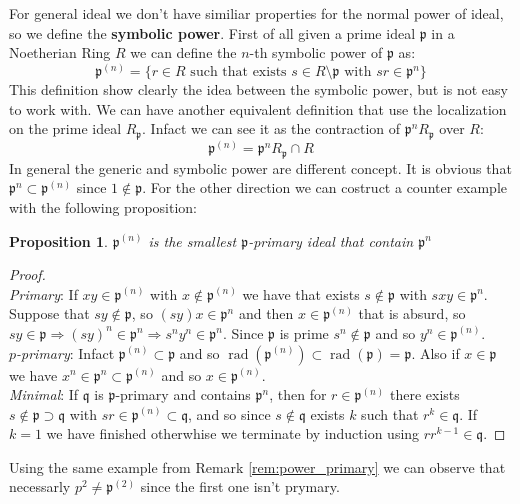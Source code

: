 \documentclass[]{book}
\theoremstyle{plain}
\newtheorem{prop}[teo]{Proposition}
\theoremstyle{remark}
\theoremstyle{definition}
\newcommand{\p}{\mathfrak{p}}
\newcommand{\q}{\mathfrak{q}}
\DeclareMathOperator{\rad}{rad}
\begin{document}
	For general ideal we don't have similiar properties for the normal power of ideal, so we define the \textbf{symbolic power}. %
	First of all given a prime ideal $ \p $ in a Noetherian Ring $ R $ we can define the $ n $-th symbolic power of $ \p $ as:
	\begin{equation}\label{eq:sym_pow_p1}
		\p^{(n)} = \{ r \in R \text{ such that exists } s \in R \setminus \p \text{ with } sr \in \p^n \}
	\end{equation}
	This definition show clearly the idea between the symbolic power, but is not easy to work with. We can have another equivalent definition that use the localization on the prime ideal $ R_\p $. Infact we can see it as the contraction of $ \p^n R_\p $ over $ R $:
	\begin{equation}\label{eq:sym_pow_p2}
		\p^{(n)} = \p^n R_\p \cap R
	\end{equation}
	In general the generic and symbolic power are different concept. It is obvious that $ \p^{n} \subset \p^{(n)} $ since $ 1 \not \in \p $. For the other direction we can costruct a counter example with the following proposition:
	\begin{prop}\label{prop:sym_is_primary}
		$ \p^{(n)} $ is the smallest $ \p $-primary ideal that contain $ \p^n $
	\end{prop}
	\begin{proof}\quad \\
		\textit{Primary}: If $ xy \in  \p^{(n)}$ with $ x \not \in  \p^{(n)}$ we have that exists $ s \not \in \p $ with $ sxy \in \p^n $. Suppose that $ sy \not \in \p $, so $ (sy)x \in \p^n $ and then $ x \in \p^{(n)} $ that is absurd, so $ sy \in \p \Rightarrow (sy)^n \in \p^n \Rightarrow s^n y^n \in \p^n$. Since $ \p $ is prime $ s^n \not \in \p $ and so $ y^n \in \p^{(n)} $. \\
		\textit{$p$-primary}: Infact $ \p^{(n)} \subset \p $ and so $  \rad  (\p^{(n)} )\subset \rad (\p) = \p$. Also if $ x \in \p $ we have $ x^n \in \p^n \subset \p^{(n)}  $ and so $ x \in \p^{(n)}  $.\\
		\textit{Minimal}: If $ \q $ is $ \p $-primary and contains $ \p^n $, then for $ r \in \p^{(n)}  $ there exists $ s \not \in \p \supset \q $ with $ sr \in \p^{(n)}  \subset \q $, and so since $ s \not \in \q  $ exists $ k $ such that $ r^k \in \q $. If $ k=1 $ we have finished otherwhise we terminate by induction using $ r r^{k-1} \in \q $.
	\end{proof}
	Using the same example from Remark \ref{rem:power_primary} we can observe that necessarly $ p^2 \neq \p^{(2)}  $ since the first one isn't prymary. 
	
\end{document}
